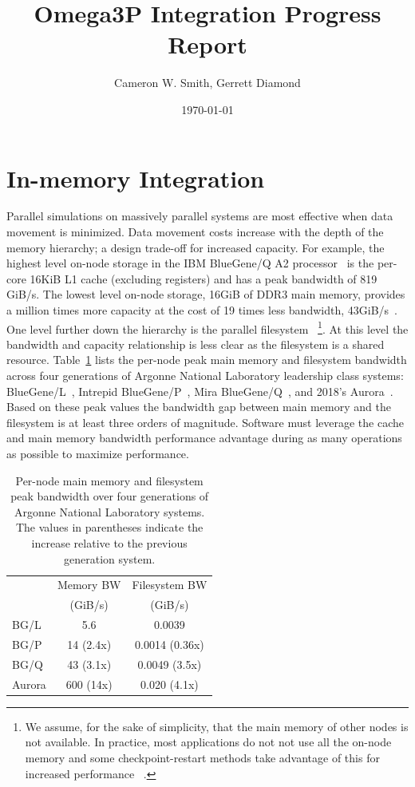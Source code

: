 \documentclass[a4paper]{article}
\title{Omega3P Integration Progress Report}
\author{Cameron W. Smith, Gerrett Diamond}
\date{\today}
\begin{document}
\maketitle

\section{In-memory Integration}

Parallel simulations on massively parallel systems are most effective when data
movement is minimized.
Data movement costs increase with the depth of the memory hierarchy; a design
trade-off for increased capacity.
For example, the highest level on-node storage in the IBM BlueGene/Q A2
processor~\cite{haring2012ibm} is the per-core 16KiB L1 cache (excluding
registers) and has a peak bandwidth of 819 GiB/s.
The lowest level on-node storage, 16GiB of DDR3 main memory, provides a million
times more capacity at the cost of 19 times less bandwidth,
43GiB/s~\cite{lo2014roofline}.
One level further down the hierarchy is the parallel filesystem
~\footnote{We assume, for the sake of simplicity, that the main memory of other nodes is not
available.
In practice, most applications do not not use all the on-node memory and some
checkpoint-restart methods take advantage of this for increased performance
~\cite{rma-fault-tolerance-2014,isaila2014making,compression-cr-2012}.
}.
At this level the bandwidth and capacity relationship is less clear as the
filesystem is a shared resource.
Table~\ref{tbl:systems} lists the per-node peak main memory and filesystem
bandwidth across four generations of Argonne National Laboratory leadership
class systems: BlueGene/L~\cite{yu2006high,adiga2002overview}, Intrepid
BlueGene/P~\cite{lang2009performance,alam2008early}, Mira
BlueGene/Q~\cite{haring2012ibm,bui2014scalable}, and 2018's
Aurora~\cite{aurorafacts}.
Based on these peak values the bandwidth gap between main memory and the
filesystem is at least three orders of magnitude.
Software must leverage the cache and main memory bandwidth performance advantage
during as many operations as possible to maximize performance.

\begin{table}[h]
\centering
\caption{Per-node main memory and filesystem peak bandwidth over four
  generations of Argonne National Laboratory systems.
  The values in parentheses indicate the increase relative to
  the previous generation system.}
\label{tbl:systems}
\begin{tabular}{l|cc}
        & Memory BW & Filesystem BW \\
        & (GiB/s)    & (GiB/s)    \\
 \hline
 BG/L   & 5.6       & 0.0039         \\
 BG/P   & 14 (2.4x) & 0.0014 (0.36x)   \\
 BG/Q   & 43 (3.1x) & 0.0049 (3.5x) \\
 Aurora & 600 (14x) & 0.020 (4.1x)
\end{tabular}
\end{table}
\end{document}
